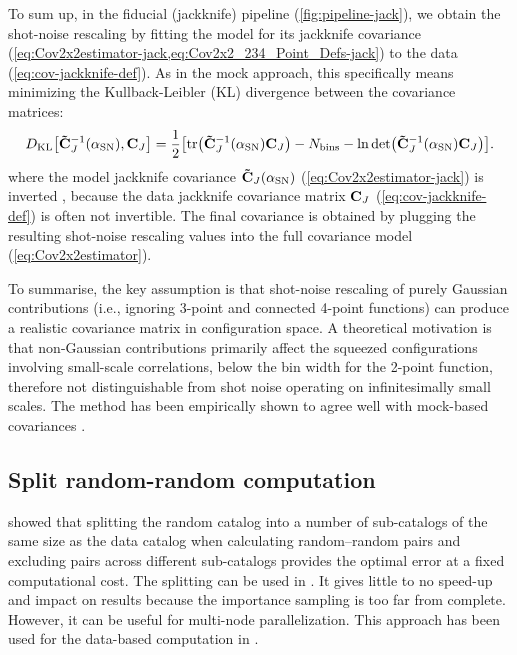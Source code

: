 To sum up, in the fiducial (jackknife) pipeline (\cref{fig:pipeline-jack}), we obtain the shot-noise rescaling by fitting the model for its jackknife covariance (\cref{eq:Cov2x2estimator-jack,eq:Cov2x2_234_Point_Defs-jack}) to the data (\cref{eq:cov-jackknife-def}).
As in the mock approach, this specifically means minimizing the Kullback-Leibler (KL) divergence between the covariance matrices:
\begin{equation} \label{D_KL-fit-jack}
    D_{\rm KL} \qty[{\bf \tilde C}_J^{-1}\qty(\alpha_{\rm SN}), {\bf C}_J] = \frac12 \qty[\tr({\bf \tilde C}_J^{-1}\qty(\alpha_{\rm SN}) {\bf C}_J) - N_{\rm bins} - \ln \det({\bf \tilde C}_J^{-1}\qty(\alpha_{\rm SN}) {\bf C}_J)].
\end{equation}
where the model jackknife covariance ${\bf \tilde C}_J\qty(\alpha_{\rm SN})$ (\cref{eq:Cov2x2estimator-jack}) is inverted \citep{rascalC}, because the data jackknife covariance matrix ${\bf C}_J$ (\cref{eq:cov-jackknife-def}) is often not invertible.
The final covariance is obtained by plugging the resulting shot-noise rescaling values into the full covariance model (\cref{eq:Cov2x2estimator}).

To summarise, the key assumption is that shot-noise rescaling of purely Gaussian contributions (i.e., ignoring 3-point and connected 4-point functions) can produce a realistic covariance matrix in configuration space.
A theoretical motivation is that non-Gaussian contributions primarily affect the squeezed configurations involving small-scale correlations, below the bin width for the 2-point function, therefore not distinguishable from shot noise operating on infinitesimally small scales.
The method has been empirically shown to agree well with mock-based covariances \citep{rascal,SDSS-rascal,KP4s7-Rashkovetskyi}.

\subsection{Split random-random computation}
\label{sec:split-RR}

\citet{split-randoms} showed that splitting the random catalog into a number of sub-catalogs of the same size as the data catalog when calculating random–random pairs and excluding pairs across different sub-catalogs provides the optimal error at a fixed computational cost.
The splitting can be used in \rascalc{}.
It gives little to no speed-up and impact on results because the importance sampling is too far from complete.
However, it can be useful for multi-node parallelization.
This approach has been used for the data-based \rascalc{} computation in \cite{BAO.EDR.Moon.2023}.

